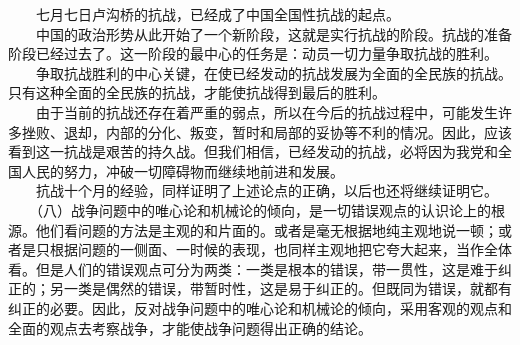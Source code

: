 \documentclass[cn,11pt,chinese]{elegantbook}
\begin{document}
　　七月七日卢沟桥的抗战，已经成了中国全国性抗战的起点。\\
　　中国的政治形势从此开始了一个新阶段，这就是实行抗战的阶段。抗战的准备阶段已经过去了。这一阶段的最中心的任务是：动员一切力量争取抗战的胜利。\\
　　争取抗战胜利的中心关键，在使已经发动的抗战发展为全面的全民族的抗战。只有这种全面的全民族的抗战，才能使抗战得到最后的胜利。\\
　　由于当前的抗战还存在着严重的弱点，所以在今后的抗战过程中，可能发生许多挫败、退却，内部的分化、叛变，暂时和局部的妥协等不利的情况。因此，应该看到这一抗战是艰苦的持久战。但我们相信，已经发动的抗战，必将因为我党和全国人民的努力，冲破一切障碍物而继续地前进和发展。\\
　　抗战十个月的经验，同样证明了上述论点的正确，以后也还将继续证明它。\\
　　（八）战争问题中的唯心论和机械论的倾向，是一切错误观点的认识论上的根源。他们看问题的方法是主观的和片面的。或者是毫无根据地纯主观地说一顿；或者是只根据问题的一侧面、一时候的表现，也同样主观地把它夸大起来，当作全体看。但是人们的错误观点可分为两类：一类是根本的错误，带一贯性，这是难于纠正的；另一类是偶然的错误，带暂时性，这是易于纠正的。但既同为错误，就都有纠正的必要。因此，反对战争问题中的唯心论和机械论的倾向，采用客观的观点和全面的观点去考察战争，才能使战争问题得出正确的结论。\\
\end{document}
